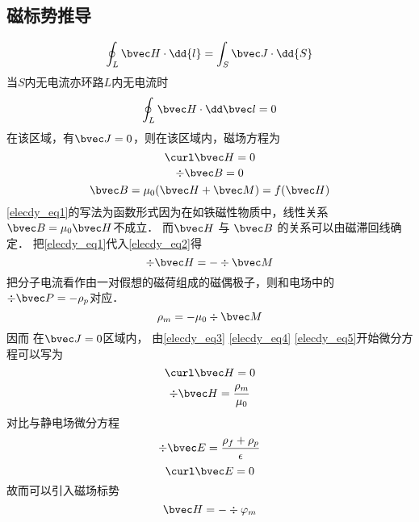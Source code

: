 
\subsection{磁标势推导}
\begin{equation}
\oint_L \bvec H \cdot \dd{l} = \int_S \bvec J \cdot \dd{S}
\end{equation}
当$S$内无电流亦环路$L$内无电流时
\begin{equation}
\oint_ L\bvec H \cdot \dd \bvec l = 0
\end{equation}
在该区域，有$\bvec J=0$，则在该区域内，磁场方程为 
\begin{equation}\label{elecdy_eq3}
\curl \bvec H =0
\end{equation}
\begin{equation}\label{elecdy_eq2}
\div \bvec B=0
\end{equation}
\begin{equation}\label{elecdy_eq1}
\bvec B=\mu_0(\bvec H+\bvec M)=f(\bvec H)
\end{equation}
\autoref{elecdy_eq1}的写法为函数形式因为在如铁磁性物质中，线性关系$\bvec B=\mu_0 \bvec H$不成立．
而$\bvec H$ 与 $\bvec B$ 的关系可以由磁滞回线确定．
把\autoref{elecdy_eq1}代入\autoref{elecdy_eq2}得
\begin{equation}\label{elecdy_eq4}
\div \bvec H= - \div \bvec M
\end{equation}
把分子电流看作由一对假想的磁荷组成的磁偶极子，则和电场中的$\div \bvec P=-\rho _p$对应．
\begin{equation}\label{elecdy_eq5}
\rho_m=-\mu_0 \div \bvec M
\end{equation}
因而 在$\bvec J=0$区域内， 由\autoref{elecdy_eq3} \autoref{elecdy_eq4} \autoref{elecdy_eq5}开始微分方程可以写为
\begin{equation}
\curl \bvec H=0 
\end{equation}
\begin{equation}
\div \bvec H= \dfrac{\rho_m}{\mu_0}
\end{equation}
对比与静电场微分方程
\begin{equation}
\div \bvec E=\dfrac{\rho_f+\rho_p}{\epsilon}
\end{equation}
\begin{equation}
\curl \bvec E=0
\end{equation}
故而可以引入磁场标势
\begin{equation}
\bvec H=-\div \varphi_m
\end{equation}
